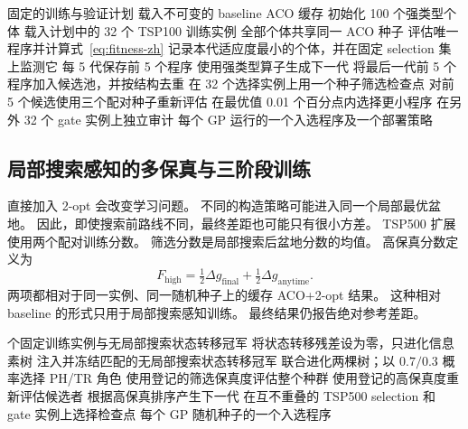 \documentclass[letterpaper,journal]{IEEEtran}
\begin{document}
\begin{algorithm}[t]
\caption{GP 训练与候选程序选择}
\label{alg:gp-training-zh}
\begin{algorithmic}[1]
\REQUIRE 固定的训练与验证计划
\STATE 载入不可变的 baseline ACO 缓存
\STATE 初始化 100 个强类型个体
    \STATE 载入计划中的 32 个 TSP100 训练实例
    \STATE 全部个体共享同一 ACO 种子
    \STATE 评估唯一程序并计算式~\eqref{eq:fitness-zh}
    \STATE 记录本代适应度最小的个体，并在固定 selection 集上监测它
    \STATE 每 5 代保存前 5 个程序
    \STATE 使用强类型算子生成下一代
\ENDFOR
\STATE 将最后一代前 5 个程序加入候选池，并按结构去重
\STATE 在 32 个选择实例上用一个种子筛选检查点
\STATE 对前 5 个候选使用三个配对种子重新评估
\STATE 在最优值 0.01 个百分点内选择更小程序
\STATE 在另外 32 个 gate 实例上独立审计
\RETURN 每个 GP 运行的一个入选程序及一个部署策略
\end{algorithmic}
\end{algorithm}

\subsection{局部搜索感知的多保真与三阶段训练}

直接加入 2-opt 会改变学习问题。
不同的构造策略可能进入同一个局部最优盆地。
因此，即使搜索前路线不同，最终差距也可能只有很小方差。
TSP500 扩展使用两个配对训练分数。
筛选分数是局部搜索后盆地分数的均值。
高保真分数定义为
\begin{equation}
 F_{\mathrm{high}}
 =\tfrac12\Delta g_{\mathrm{final}}
 +\tfrac12\Delta g_{\mathrm{anytime}} .
 \label{eq:ls-fitness-zh}
\end{equation}
两项都相对于同一实例、同一随机种子上的缓存 ACO+2-opt 结果。
这种相对 baseline 的形式只用于局部搜索感知训练。
最终结果仍报告绝对参考差距。

\begin{algorithm}[t]
\caption{三阶段 TSP500 局部搜索感知进化}
\label{alg:ls-training-zh}
\begin{algorithmic}[1]
 个固定训练实例与无局部搜索状态转移冠军
        \STATE 将状态转移残差设为零，只进化信息素树
        \STATE 注入并冻结匹配的无局部搜索状态转移冠军
    \ELSE
        \STATE 联合进化两棵树；以 \(0.7/0.3\) 概率选择 PH/TR 角色
    \ENDIF
    \STATE 使用登记的筛选保真度评估整个种群
    \STATE 使用登记的高保真度重新评估候选者
    \STATE 根据高保真排序产生下一代
\ENDFOR
\STATE 在互不重叠的 TSP500 selection 和 gate 实例上选择检查点
\RETURN 每个 GP 随机种子的一个入选程序
\end{algorithmic}
\end{algorithm}
\end{document}
